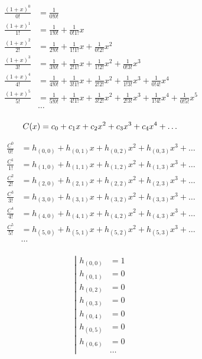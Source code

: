\begin{equation*}
\begin{aligned}
\frac{(1 + x)^0}{0!} &=
  \frac{1}{0!0!} 
\\
\frac{(1 + x)^1}{1!} &=
  \frac{1}{1!0!} 
+ \frac{1}{0!1!} x
\\
\frac{(1 + x)^2}{2!} &= 
  \frac{1}{2!0!} 
+ \frac{1}{1!1!} x 
+ \frac{1}{0!2!} x^2
\\
\frac{(1 + x)^3}{3!} &=
  \frac{1}{3!0!} 
+ \frac{1}{2!1!} x 
+ \frac{1}{1!2!} x^2 
+ \frac{1}{0!3!} x^3
\\
\frac{(1 + x)^4}{4!} &=
  \frac{1}{4!0!} 
+ \frac{1}{3!1!} x 
+ \frac{1}{2!2!} x^2 
+ \frac{1}{1!3!} x^3 
+ \frac{1}{0!4!} x^4
\\
\frac{(1 + x)^5}{5!} &=
  \frac{1}{5!0!} 
+ \frac{1}{4!1!} x 
+ \frac{1}{3!2!} x^2 
+ \frac{1}{2!3!} x^3 
+ \frac{1}{1!4!} x^4
+ \frac{1}{0!5!} x^5
\\
&\ldots
\\
\end{aligned}
\end{equation*}

\begin{equation*}
C(x) = c_0 + c_1 x + c_2 x^2 + c_3 x^3 + c_4 x^4 + \ldots \\
\end{equation*}

\begin{equation*} \begin{aligned}
\frac{C^0}{0!} &= h_{(0,0)} + h_{(0,1)} x + h_{(0,2)} x^2 + h_{(0,3)} x^3 + \ldots \\
\frac{C^1}{1!} &= h_{(1,0)} + h_{(1,1)} x + h_{(1,2)} x^2 + h_{(1,3)} x^3 + \ldots \\
\frac{C^2}{2!} &= h_{(2,0)} + h_{(2,1)} x + h_{(2,2)} x^2 + h_{(2,3)} x^3 + \ldots \\
\frac{C^3}{3!} &= h_{(3,0)} + h_{(3,1)} x + h_{(3,2)} x^2 + h_{(3,3)} x^3 + \ldots \\
\frac{C^4}{4!} &= h_{(4,0)} + h_{(4,1)} x + h_{(4,2)} x^2 + h_{(4,3)} x^3 + \ldots \\
\frac{C^5}{5!} &= h_{(5,0)} + h_{(5,1)} x + h_{(5,2)} x^2 + h_{(5,3)} x^3 + \ldots \\
&\ldots \\
\end{aligned} \end{equation*}

\begin{equation*} \left| \begin{aligned} 
h_{(0,0)} &= 1 \\ 
h_{(0,1)} &= 0 \\
h_{(0,2)} &= 0 \\
h_{(0,3)} &= 0 \\
h_{(0,4)} &= 0 \\
h_{(0,5)} &= 0 \\
h_{(0,6)} &= 0 \\
&\ldots
\end{aligned} \right. \end{equation*}

